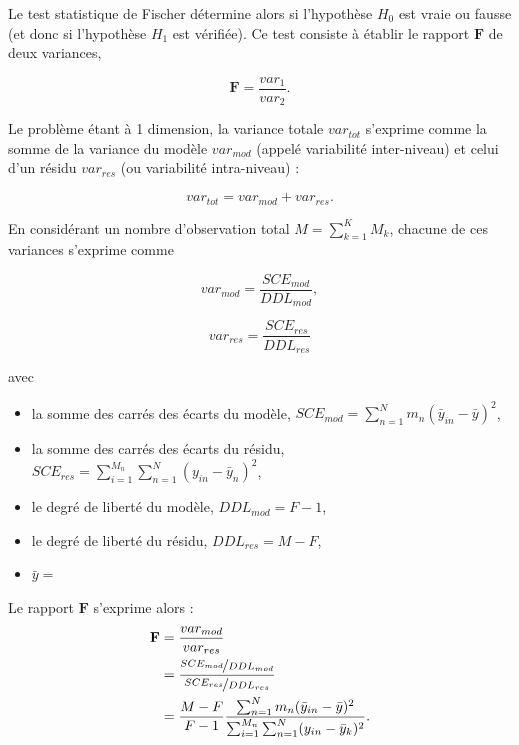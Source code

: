 Le test statistique de Fischer détermine alors si l'hypothèse $H_0$ est vraie ou fausse (et donc si l'hypothèse $H_1$ est vérifiée). Ce test consiste à établir le rapport $\mathbf{F}$ de deux variances, 
 
\begin{equation}
\mathbf{F} = \frac{var_1}{var_2}.
\end{equation}

Le problème étant à 1 dimension, la variance totale $var_{tot}$ s'exprime comme la somme de la variance du modèle $var_{mod}$ (appelé variabilité inter-niveau) et celui d'un résidu $var_{res}$ (ou variabilité intra-niveau) : 

\begin{equation}
var_{tot} = var_{mod} + var_{res}.
\end{equation}

En considérant un nombre d'observation total $M = \sum_{k = 1}^{K} M_k$, chacune de ces variances s'exprime comme


\begin{equation}
var_{mod} = \frac{SCE_{mod}}{DDL_{mod}},
\end{equation}

\begin{equation}
var_{res} = \frac{SCE_{res}}{DDL_{res}} 
\end{equation}

avec 

\begin{itemize}
\item la somme des carrés des écarts du modèle, $SCE_{mod} = \sum_{n=1}^{N} m_n (\bar{y}_{in} - \bar{y})^2$, 
\item la somme des carrés des écarts du résidu, $SCE_{res} = \sum_{i=1}^{M_n} \sum_{n=1}^{N} (y_{in} - \bar{y}_n)^2$, 
\item le degré de liberté du modèle, $DDL_{mod} = F-1$,
\item le degré de liberté du résidu, $DDL_{res} = M-F$, 
\item $\bar{y} = $
\end{itemize}


Le rapport $\mathbf{F}$ s'exprime alors : 
\begin{align}
\mathbf{F} & = \frac{var_{mod}}{var_{res}}\\
& = \frac{\nicefrac{SCE_{mod}}{DDL_{mod}}}{\nicefrac{SCE_{res}}{DDL_{res}}}\\
& = \frac{M-F}{F-1}\frac{\sum_{n=1}^{N} m_n (\bar{y}_{in} - \bar{y})^2}{\sum_{i=1}^{M_n} \sum_{n=1}^{N} (y_{in} - \bar{y}_k)^2}.
\end{align}

